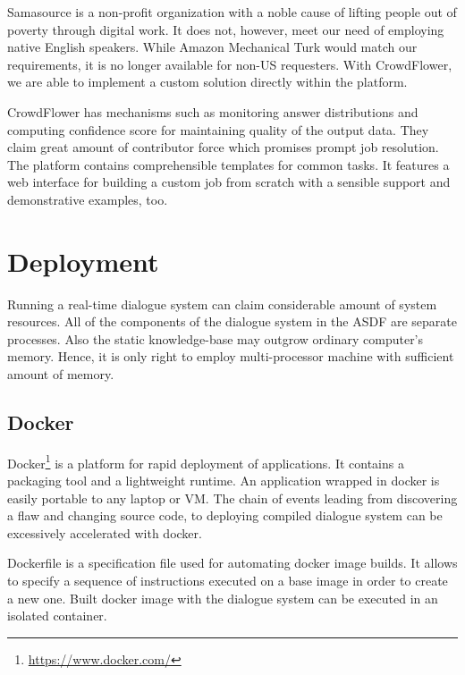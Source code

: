 Samasource is a non-profit organization with a noble cause of lifting people out of poverty through digital work.
It does not, however, meet our need of employing native English speakers.
While Amazon Mechanical Turk would match our requirements, it is no longer available for non-US requesters.
With CrowdFlower, we are able to implement a custom solution directly within the platform.

CrowdFlower has mechanisms such as monitoring answer distributions and computing confidence score for maintaining quality of the output data. %
They claim great amount of contributor force which promises prompt job resolution. %
The platform contains comprehensible templates for common tasks.
It features a web interface for building a custom job from scratch with a sensible support and demonstrative examples, too. %


\section{Deployment}

Running a real-time dialogue system can claim considerable amount of system resources.
All of the components of the dialogue system in the \ac{ASDF} 
are separate processes.
Also the static knowledge-base may outgrow ordinary computer's memory.
Hence, it is only right to employ multi-processor machine with sufficient amount of memory.

\subsection{Docker}

Docker\footnote{\url{https://www.docker.com/}} is a platform for rapid deployment of applications.
It contains a packaging tool and a lightweight runtime.
An application wrapped in docker is easily portable to any laptop or \acf{VM}.
The chain of events leading from discovering a flaw and changing source code, to deploying compiled dialogue system can be excessively accelerated with docker.

Dockerfile is a specification file used for automating docker image builds.
It allows to specify a sequence of instructions executed on a base image in order to create a new one.
Built docker image with the dialogue system can be executed in an isolated container.

